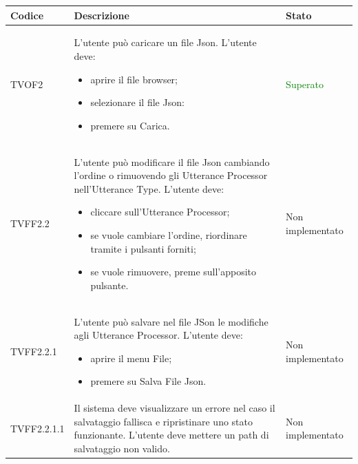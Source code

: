 \documentclass[openany,12pt,a4paper]{report}
\begin{document}
\begin{longtable}[c]{| p{2.5cm} |p{8cm} | p{2.5cm} |}
	\hline
	\textbf{Codice} & \textbf{Descrizione} & \textbf{Stato}\\
	\hline
	\endhead
	
	\newline TVOF2&
	\newline L'utente può caricare un file Json. L'utente deve:
	\begin{itemize}
		\item aprire il file browser;
		\item selezionare il file Json:
		\item premere su Carica.
	\end{itemize}&
	\newline \textcolor{green}{Superato}
	\\[1em]	
	\hline	
	
	\newline TVFF2.2&
	\newline L'utente può modificare il file Json cambiando l'ordine o rimuovendo gli Utterance Processor nell'Utterance Type. L'utente deve:
	\begin{itemize}
		\item cliccare sull'Utterance Processor;
		\item se vuole cambiare l'ordine, riordinare tramite i pulsanti forniti;
		\item se vuole rimuovere, preme sull'apposito pulsante. 
	\end{itemize}&
	\newline Non implementato
	\\[1em]	
	\hline
	
	\newline TVFF2.2.1&
	\newline L'utente può salvare nel file JSon le modifiche agli Utterance Processor. L'utente deve:
	\begin{itemize}
		\item aprire il menu File;
		\item premere su Salva File Json.
	\end{itemize}&
	\newline Non implementato
	\\[1em]	
	\hline
	
	\newline TVFF2.2.1.1&
	\newline Il sistema deve visualizzare un errore nel caso il salvataggio fallisca e ripristinare uno stato funzionante. L'utente deve mettere un path di salvataggio non valido.&
	\newline Non implementato
	\\[1em]	
	\hline
	

\end{longtable}
\end{document}

